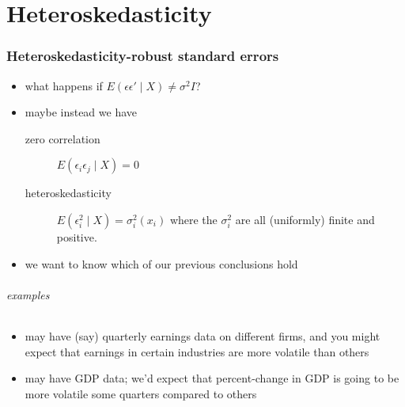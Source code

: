 

\part*{Heteroskedasticity}%
\section{Heteroskedasticity-robust standard errors}

\begin{itemize}
\item what happens if $E(\epsilon \epsilon' \mid X) \neq \sigma^2 I$?
\item maybe instead we have
\begin{description}
\item[zero correlation] $E(\epsilon_i \epsilon_j \mid X) = 0$
\item[heteroskedasticity] $E(\epsilon_i^2 \mid X) =
            \sigma_i^2(x_i)$ where the $\sigma_i^2$ are all
            (uniformly) finite and positive.
\end{description}
\item we want to know which of our previous conclusions hold
\end{itemize}

\paragraph{examples}
\begin{itemize}
\item may have (say) quarterly earnings data on different firms, and
        you might expect that earnings in certain industries are more
        volatile than others
\item may have GDP data; we'd expect that percent-change in GDP is
        going to be more volatile some quarters compared to others
\end{itemize}

